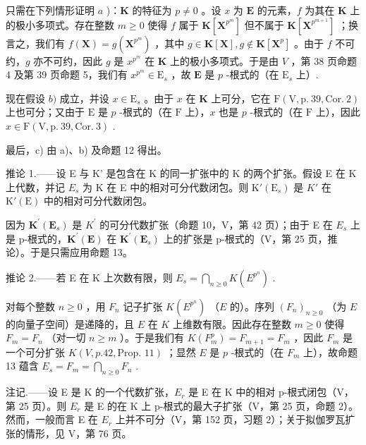只需在下列情形证明 \(a\) )：\(\mathbf{K}\) 的特征为 \(p \neq 0\) 。设 \(x\) 为 \(\mathbf{E}\) 的元素，\(f\) 为其在 \(\mathbf{K}\) 上的极小多项式。存在整数 \(m \geqslant 0\) 使得 \(f\) 属于 \(\mathbf{K}[\mathbf{X}^{p^m}]\) 但不属于 \(\mathbf{K}[\mathbf{X}^{p^{m+1}}]\) ；换言之，我们有 \(f(\mathbf{X}) = g(\mathbf{X}^{p^m})\) ，其中 \(g \in \mathbf{K}[\mathbf{X}], g \notin \mathbf{K}[\mathbf{X}^p]\) 。由于 \(f\) 不可约，\(g\) 亦不可约，因此 \(g\) 是 \(x^{p^m}\) 在 \(\mathbf{K}\) 上的极小多项式。于是由 \(V\) ，第 38 页命题 4 及第 39 页命题 5，我们有 \(x^{p^m} \in \mathrm{E}_s\) ，故 \(\mathbf{E}\) 是 \(p\) -根式的（在 \(\mathrm{E}_s\) 上）.

现在假设 \(b)\) 成立，并设 \(x \in \mathrm{E}_s\) 。由于 \(x\) 在 \(\mathbf{K}\) 上可分，它在 \(\mathrm{F}(\mathrm{V}, \mathrm{p.~39}, \mathrm{Cor.~2})\) 上也可分；又由于 \(\mathrm{E}\) 是 \(p\) -根式的（在 \(\mathrm{F}\) 上），\(x\) 也是 \(p\) -根式的（在 \(\mathrm{F}\) 上），因此 \(x \in \mathrm{F}(\mathrm{V}, \mathrm{p.~39}, \mathrm{Cor.~3})\) .

最后，c) 由 a)、b) 及命题 12 得出。

推论 1.——设 E 与 K' 是包含在 K 的同一扩张中的 K 的两个扩张。假设 E 在 K 上代数，并记 \(E_{s}\) 为 K 在 E 中的相对可分代数闭包。则 \(\mathrm{K}'(\mathrm{E}_{s})\) 是 \(K'\) 在 \(\mathrm{K}'(\mathrm{E})\) 中的相对可分代数闭包。

因为 \(\mathbf{K}^{\prime}(\mathbf{E}_{s})\) 是 \(K^{\prime}\) 的可分代数扩张（命题 10，V，第 42 页）；由于 E 在 \(E_{s}\) 上是 p-根式的，\(\mathbf{K}^{\prime}(\mathbf{E})\) 在 \(\mathbf{K}^{\prime}(\mathbf{E}_{s})\) 上的扩张是 p-根式的（V，第 25 页，推论）。于是只需应用命题 13。

推论 2.——若 E 在 K 上次数有限，则 \(E_{s} = \bigcap_{n \geqslant 0} K(E^{p^{n}})\) .

对每个整数 \(n \geqslant 0\) ，用 \(F_n\) 记子扩张 \(K(E^{p^n})\) （\(E\) 的）。序列 \((F_n)_{n \geqslant 0}\) （为 \(E\) 的向量子空间）是递降的，且 \(E\) 在 \(K\) 上维数有限。因此存在整数 \(m \geqslant 0\) 使得 \(F_m = F_n\) （对一切 \(n \geqslant m\) ）。于是我们有 \(K(F_m^p) = F_{m+1} = F_m\) ，因此 \(F_m\) 是一个可分扩张 \(K(V, p. 42, \text{Prop. } 11)\) ；显然 \(E\) 是 \(p\) -根式的（在 \(F_m\) 上），故命题 13 蕴含 \(E_s = F_m = \bigcap_{n \geqslant 0} F_n\) .

注记.——设 E 是 K 的一个代数扩张，\(E_{r}\) 是 E 在 K 中的相对 p-根式闭包（V，第 25 页）。则 \(E_{r}\) 是 E 的在 K 上 p-根式的最大子扩张（V，第 25 页，命题 2）。然而，一般而言 E 在 \(E_{r}\) 上并不可分（V，第 152 页，习题 2）；关于拟伽罗瓦扩张的情形，见 V，第 76 页。


